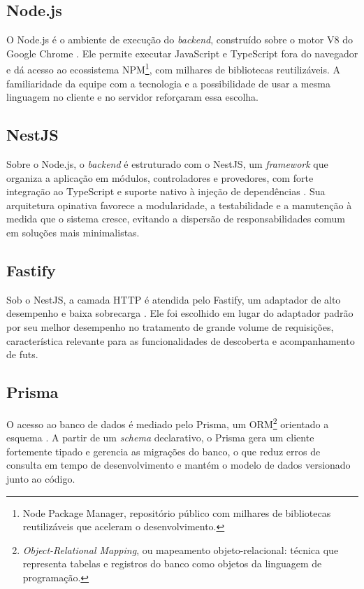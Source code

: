         \subsection{Node.js}
        O Node.js é o ambiente de execução do \textit{backend}, construído sobre o motor V8 do Google Chrome \cite{node_docs}. Ele permite executar JavaScript e TypeScript fora do navegador e dá acesso ao ecossistema NPM\footnote{Node Package Manager, repositório público com milhares de bibliotecas reutilizáveis que aceleram o desenvolvimento.}, com milhares de bibliotecas reutilizáveis. A familiaridade da equipe com a tecnologia e a possibilidade de usar a mesma linguagem no cliente e no servidor reforçaram essa escolha.

        \subsection{NestJS}
        Sobre o Node.js, o \textit{backend} é estruturado com o NestJS, um \textit{framework} que organiza a aplicação em módulos, controladores e provedores, com forte integração ao TypeScript e suporte nativo à injeção de dependências \cite{nestjs_docs}. Sua arquitetura opinativa favorece a modularidade, a testabilidade e a manutenção à medida que o sistema cresce, evitando a dispersão de responsabilidades comum em soluções mais minimalistas.

        \subsection{Fastify}
        Sob o NestJS, a camada HTTP é atendida pelo Fastify, um adaptador de alto desempenho e baixa sobrecarga \cite{fastify_docs}. Ele foi escolhido em lugar do adaptador padrão por seu melhor desempenho no tratamento de grande volume de requisições, característica relevante para as funcionalidades de descoberta e acompanhamento de futs.

        \subsection{Prisma}
        O acesso ao banco de dados é mediado pelo Prisma, um ORM\footnote{\textit{Object-Relational Mapping}, ou mapeamento objeto-relacional: técnica que representa tabelas e registros do banco como objetos da linguagem de programação.} orientado a esquema \cite{prisma_docs}. A partir de um \textit{schema} declarativo, o Prisma gera um cliente fortemente tipado e gerencia as migrações do banco, o que reduz erros de consulta em tempo de desenvolvimento e mantém o modelo de dados versionado junto ao código.

